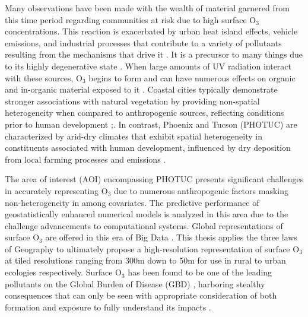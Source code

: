 Many observations have been made with the wealth of material garnered from this time period regarding communities at risk due to high surface O$_3$ concentrations. This reaction is exacerbated by urban heat island effects, vehicle emissions, and industrial processes that contribute to a variety of pollutants resulting from the mechanisms that drive it \parencite{afonso_characterization_2017,li_effects_2014}. It is a precursor to many things due to its highly degenerative state \parencite{afonso_characterization_2017}. When large amounts of UV radiation interact with these sources, O$_3$ begins to form and can have numerous effects on organic and in-organic material exposed to it \parencite{chapleski_heterogeneous_2016,huang_biogenic_2024,brauer_global_2024}. Coastal cities typically demonstrate stronger associations with natural vegetation by providing non-spatial heterogeneity when compared to anthropogenic sources, reflecting conditions prior to human development \parencite{cai_oxidative_2022};\cite{chen_analysis_2024,martins_spatial_2016}. In contrast, Phoenix and Tucson (PHOTUC) are characterized by arid-dry climates that exhibit spatial heterogeneity in constituents associated with human development, influenced by dry deposition from local farming processes and emissions \parencite{chiacchiaretta_inland_2024,ding_contrasting_2023,le_tourneau_socio-ecological_2024,ye_diagnosing_2022}. 

The area of interest (AOI) encompassing PHOTUC presents significant challenges in accurately representing O$_3$ due to numerous anthropogenic factors masking non-heterogeneity in among covariates. The predictive performance of geostatistically enhanced numerical models is analyzed in this area due to the challenge advancements to computational systems. Global representations of surface O$_3$ are offered in this era of Big Data \cite{cao_deep_2022,bughin_big_2016,curry_big_2016,xu_mapping_2023}. This thesis applies the three laws of Geography to ultimately propose a high-resolution representation of surface O$_3$ at tiled resolutions ranging from 300m down to 50m for use in rural to urban ecologies respectively. Surface O$_3$ has been found to be one of the leading pollutants on the Global Burden of Disease (GBD) \parencite{brauer_global_2024,liu_toward_2024,sang2022}, harboring stealthy consequences that can only be seen with appropriate consideration of both formation and exposure to fully understand its impacts \parencite{watson_machine_2019,abdullah_relationship_2017,carvalho_o3_2022}. 

